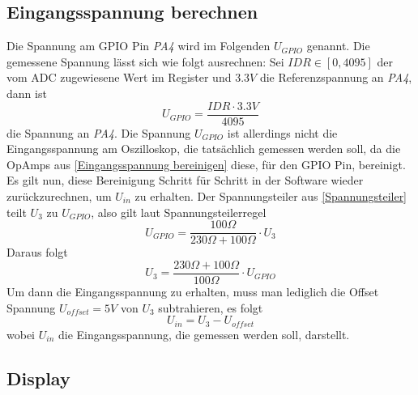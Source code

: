 \subsection{Eingangsspannung berechnen}
Die Spannung am GPIO Pin \textit{PA4} wird im Folgenden $U_{GPIO}$ genannt. \newline
Die gemessene Spannung lässt sich wie folgt ausrechnen: \newline
Sei $IDR \in [0, 4095]$ der vom ADC zugewiesene Wert im Register
und $3.3V$ die Referenzspannung an \textit{PA4},
dann ist
$$
	U_{GPIO} = \frac{IDR \cdot 3.3V}{4095}
$$
die Spannung an \textit{PA4}.
\newline \newline
Die Spannung $U_{GPIO}$ ist allerdings nicht die Eingangsspannung am Oszilloskop, die tatsächlich gemessen werden soll, da die OpAmps aus \ref{Eingangsspannung bereinigen} diese, für den GPIO Pin, bereinigt.
Es gilt nun, diese Bereinigung Schritt für Schritt in der Software wieder zurückzurechnen, um $U_{in}$ zu erhalten. \newline
Der Spannungsteiler aus \ref{Spannungsteiler} teilt $U_3$
zu $U_{GPIO}$, also gilt laut Spannungsteilerregel
$$
	U_{GPIO} = \frac{100 \Omega}{230 \Omega + 100 \Omega} \cdot U_3
$$
Daraus folgt
$$
U_3 = \frac{230 \Omega + 100 \Omega}{100 \Omega} \cdot U_{GPIO}
$$
\newline
Um dann die Eingangsspannung zu erhalten, muss man lediglich die Offset Spannung $U_{offset} = 5V$
von $U_3$ subtrahieren, es folgt
$$
	U_{in} = U_3 - U_{offset}
$$
wobei $U_{in}$ die Eingangsspannung, die gemessen werden soll, darstellt.


\subsection{Display}


